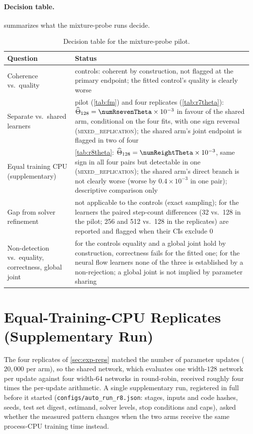 \documentclass{article}
\theoremstyle{plain}
\theoremstyle{definition}
\theoremstyle{remark}
\begin{document}
\paragraph{Decision table.}
 summarizes what the mixture-probe runs decide.
\begin{table}[h]
\centering
\caption{Decision table for the mixture-probe pilot.}
\label{tab:decision}
\scriptsize
\setlength{\tabcolsep}{3pt}
\begin{tabular}{p{}p{}}
\toprule
Question & Status \\
\midrule
Coherence vs.\ quality & controls: coherent by construction, not flagged at the primary endpoint; the fitted control's quality is clearly worse \\
Separate vs.\ shared learners & pilot (\cref{tab:fm}) and four replicates (\cref{tab:r7theta}): $\widehat\Theta_{128}=\numRsevenTheta\times10^{-3}$ in favour of the shared arm, conditional on the four fits, with one sign reversal (\textsc{mixed\_replication}); the shared arm's joint endpoint is flagged in two of four \\
Equal training CPU (supplementary) & \cref{tab:r8theta}: $\widehat\Theta_{128}=\numReightTheta\times10^{-3}$, same sign in all four pairs but detectable in one (\textsc{mixed\_replication}); the shared arm's direct branch is not clearly worse (worse by $0.4\times10^{-3}$ in one pair); descriptive comparison only \\
Gap from solver refinement & not applicable to the controls (exact sampling); for the learners the paired step-count differences (32 vs.\ 128 in the pilot; 256 and 512 vs.\ 128 in the replicates) are reported and flagged when their CIs exclude $0$ \\
Non-detection vs.\ equality, correctness, global joint & for the controls equality and a global joint hold by construction, correctness fails for the fitted one; for the neural flow learners none of the three is established by a non-rejection; a global joint is not implied by parameter sharing \\
\bottomrule
\end{tabular}
\end{table}

\section{Equal-Training-CPU Replicates (Supplementary Run)}
\label{app:r8}
The four replicates of \cref{sec:exp-reps} matched the number of parameter updates ($20{,}000$ per arm), so the shared network, which evaluates one width-$128$ network per update against four width-$64$ networks in round-robin, received roughly four times the per-update arithmetic. A single supplementary run, registered in full before it started (\texttt{configs/auto\_run\_r8.json}: stages, inputs and code hashes, seeds, test set digest, estimand, solver levels, stop conditions and caps), asked whether the measured pattern changes when the two arms receive the same process-CPU training time instead.
\end{document}
